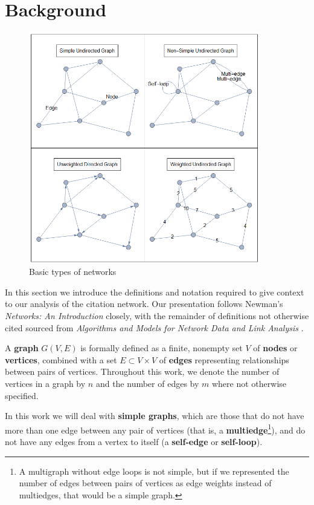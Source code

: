 \documentclass[12pt]{thesis}
\theoremstyle{plain}
\theoremstyle{definition}
\theoremstyle{remark}
\begin{document}
\section{Background}

\begin{figure}[t]
\centering
\includegraphics[width=0.9\textwidth]{basic_properties_demo.png}
\caption{Basic types of networks}
\label{fig:basic_properties_demo}
\end{figure}

In this section we introduce the definitions and notation required to give context to our analysis of the citation network. Our presentation follows Newman's \textit{Networks: An Introduction} \cite{newman2010} closely, with the remainder of definitions not otherwise cited sourced from \textit{Algorithms and Models for Network Data and Link Analysis} \cite{fouss2016}.

A \textbf{graph} $G(V,E)$ is formally defined as a finite, nonempty set $V$ of \textbf{nodes} or \textbf{vertices}, combined with a set $E\subset V\times V$ of \textbf{edges} representing relationships between pairs of vertices. Throughout this work, we denote the number of vertices in a graph by $n$ and the number of edges by $m$ where not otherwise specified.

In this work we will deal with \textbf{simple graphs}, which are those that do not have more than one edge between any pair of vertices (that is, a \textbf{multiedge}\footnote{A multigraph without edge loops is not simple, but if we represented the number of edges between pairs of vertices as edge weights instead of multiedges, that would be a simple graph.}), and do not have any edges from a vertex to itself (a \textbf{self-edge} or \textbf{self-loop}). 
\end{document}
